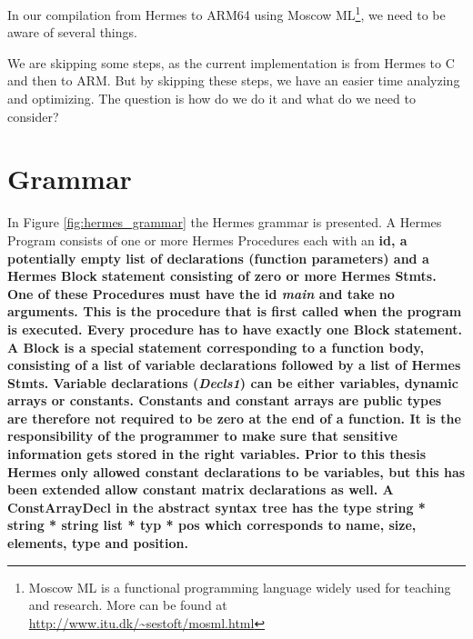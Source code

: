 In our compilation from Hermes to ARM64 using Moscow ML\footnote{Moscow ML is a functional programming language widely used for teaching and research. More can be found at \url{http://www.itu.dk/~sestoft/mosml.html}}, we need to be aware of several things.

We are skipping some steps, as the current implementation is from Hermes to C and then to ARM.
But by skipping these steps, we have an easier time analyzing and optimizing. The question is how do we do it and what do we need to consider?

\section{Grammar}
In Figure \ref{fig:hermes_grammar} the Hermes grammar is presented.
A Hermes Program consists of one or more Hermes Procedures each with an \bf{id}, a potentially empty list of declarations (function parameters) and a Hermes Block statement consisting of zero or more Hermes Stmts.
One of these Procedures must have the \bf{id} \emph{main} and take no arguments. This is the procedure that is first called when the program is executed.
Every procedure has to have exactly one Block statement. A Block is a special statement corresponding to a function body, consisting of a list of variable declarations followed by a list of Hermes Stmts.
Variable declarations (\emph{Decls1}) can be either variables, dynamic arrays or constants. Constants and constant arrays are public types are therefore not required to be zero at the end of a function. It is the responsibility of the programmer to make sure that sensitive information gets stored in the right variables.
Prior to this thesis Hermes only allowed constant declarations to be variables, but this has been extended allow constant matrix declarations as well.
A ConstArrayDecl in the abstract syntax tree has the type \bf{string * string * string list * typ * pos} which corresponds to name, size, elements, type and position.



\clearpage
\newpage

